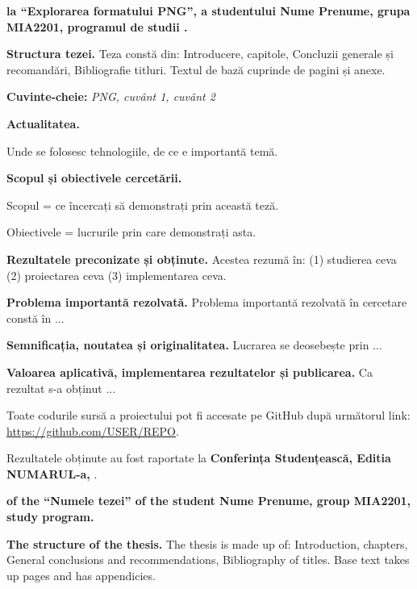 \documentclass[a4paper,12pt]{report}
\newcommand{\uniGroupName}{MIA2201}
\newcommand{\authorName}{Nume Prenume} %
\newcommand{\docTitleRo}{Explorarea formatului PNG}
\newcommand{\docTitleEng}{Numele tezei}
\newcommand{\yearOfWriting}{\the\year}
\newcommand{\conferencesList}{Conferința Studențească, Editia NUMARUL-a, \yearOfWriting}
\newcommand{\github}{\url{https://github.com/USER/REPO}}
\begin{document}
\titlePage

\clearpage
\tableofcontents


\textbf{la \docTypeRoNedefinit{} \enquote{\docTitleRo{}}, a studentului \authorName{}, grupa \uniGroupName{}, programul de studii \programulDeStudiiRo.}

\textbf{Structura tezei.}
Teza constă din: Introducere, \chapterCount{} capitole, Concluzii generale și recomandări, Bibliografie \bibliographyEntryCount{} titluri.
Textul de bază cuprinde \usefulPageCount{} de pagini și \anexeCount{} anexe.

\textbf{Cuvinte-cheie:}
\textit{\acrshort{PNG}, cuvânt 1, cuvânt 2}

\textbf{Actualitatea.}

Unde se folosesc tehnologiile, de ce e importantă temă.

\textbf{Scopul și obiectivele cercetării.}

Scopul = ce încercați să demonstrați prin această teză.

Obiectivele = lucrurile prin care demonstrați asta.

\textbf{Rezultatele preconizate și obținute.}
Acestea rezumă în:
(1) studierea ceva
(2) proiectarea ceva
(3) implementarea ceva.

\textbf{Problema importantă rezolvată.}
Problema importantă rezolvată în cercetare constă în ...

\textbf{Semnificația, noutatea și originalitatea.}
Lucrarea se deosebește prin ...

\textbf{Valoarea aplicativă, implementarea rezultatelor și publicarea.}
Ca rezultat s-a obținut ...

Toate codurile sursă a proiectului pot fi accesate pe GitHub după următorul link: \github.

Rezultatele obținute au fost raportate la \textbf{\conferencesList}\cite{self}.


\textbf{of the \docTypeEng{} \enquote{\docTitleEng{}} of the student \authorName{}, group \uniGroupName{}, \programulDeStudiiEng{} study program.}

\textbf{The structure of the thesis.}
The thesis is made up of: Introduction, \chapterCount{} chapters,
General conclusions and recommendations, Bibliography of \bibliographyEntryCount{} titles.
Base text takes up \usefulPageCount{} pages and has \anexeCount{} appendicies.
\end{document}
